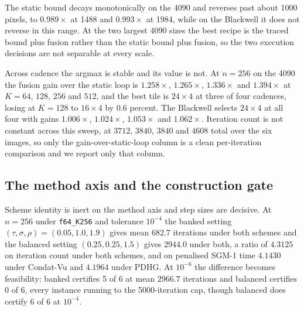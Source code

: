 The static bound decays monotonically on the 4090 and reverses past about 1000
pixels, to $0.989\times$ at 1488 and $0.993\times$ at 1984, while on the
Blackwell it does not reverse in this range. At the two largest 4090 sizes the
best recipe is the traced bound plus fusion rather than the static bound plus
fusion, so the two execution decisions are not separable at every scale.

Across cadence the argmax is stable and its value is not. At $n=256$ on the
4090 the fusion gain over the static loop is $1.258\times$, $1.265\times$,
$1.336\times$ and $1.394\times$ at $K=64$, $128$, $256$ and $512$, and the best
tile is $24\times4$ at three of four cadences, losing at $K=128$ to $16\times4$
by 0.6 percent. The Blackwell selects $24\times4$ at all four with gains
$1.006\times$, $1.024\times$, $1.053\times$ and $1.062\times$. Iteration count
is not constant across this sweep, at $3712$, $3840$, $3840$ and $4608$ total
over the six images, so only the gain-over-static-loop column is a clean
per-iteration comparison and we report only that column.

\subsection{The method axis and the construction gate}
\label{sec:exp:method}

Scheme identity is inert on the method axis and step sizes are decisive. At
$n=256$ under \texttt{f64\_K256} and tolerance $10^{-4}$ the banked setting
$(\tau, \sigma, \rho) = (0.05, 1.0, 1.9)$ gives mean $682.7$ iterations under
both schemes and the balanced setting $(0.25, 0.25, 1.5)$ gives $2944.0$ under
both, a ratio of $4.3125$ on iteration count under both schemes, and on
penalised SGM-1 time $4.1430$ under Condat-Vu and $4.1964$ under PDHG. At
$10^{-6}$ the difference becomes feasibility: banked certifies 5 of 6 at mean
$2966.7$ iterations and balanced certifies 0 of 6, every instance running to the
5000-iteration cap, though balanced does certify 6 of 6 at $10^{-4}$.

